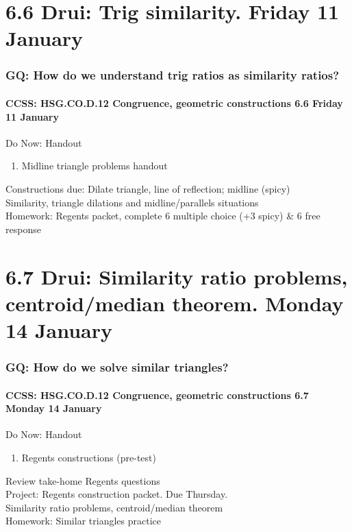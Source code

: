\documentclass{beamer}
\begin{document}
\section{6.6 Drui: Trig similarity. Friday 11 January}
  \frame
  {
    \frametitle{GQ: How do we understand trig ratios as similarity ratios?}
    \framesubtitle{CCSS: HSG.CO.D.12 Congruence, geometric constructions  \alert{6.6 Friday 11 January}}

    \begin{block}{Do Now: Handout}
      \begin{enumerate}
        \item Midline triangle problems handout
      \end{enumerate}
    \end{block}
    Constructions due: Dilate triangle, line of reflection; midline (spicy) \\[0.5cm]
    Similarity, triangle dilations and midline/parallels situations\\[0.5cm]
    Homework: Regents packet, complete 6 multiple choice (+3 spicy) \& 6 free response
  }

\section{6.7 Drui: Similarity ratio problems, centroid/median theorem. Monday 14 January}
  \frame
  {
    \frametitle{GQ: How do we solve similar triangles?}
    \framesubtitle{CCSS: HSG.CO.D.12 Congruence, geometric constructions  \alert{6.7 Monday 14 January}}

    \begin{block}{Do Now: Handout}
      \begin{enumerate}
        \item Regents constructions (pre-test)
      \end{enumerate}
    \end{block}
    Review take-home Regents questions\\
    Project: Regents construction packet. Due Thursday.\\
    Similarity ratio problems, centroid/median theorem\\[0.5cm]
    Homework: Similar triangles practice
  }
\end{document}
